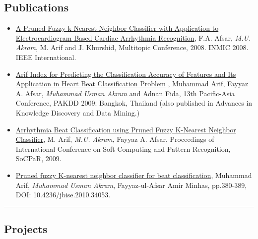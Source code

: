 \documentclass[10pt,letterpaper]{article}
\begin{document}
\subsection*{Publications}

\begin{itemize}
	\parskip=0.1em

	\item \href{http://ieeexplore.ieee.org/xpl/freeabs_all.jsp?reload=true&isnumber=4777689&arnumber=4777725&count=113&index=29}{A Pruned Fuzzy k-Nearest Neighbor Classifier with Application to Electrocardiogram Based Cardiac Arrhythmia Recognition}, F.A. Afsar,\emph{ M.U. Akram}, M. Arif and J. Khurshid, Multitopic Conference, 2008. INMIC 2008. IEEE International.
	\item \href{http://www.springerlink.com/content/w587r89h15691h20/?p=5a36883f07584ef8adbb2bbfb5761f6b&pi=0}{Arif Index for Predicting the Classification Accuracy of Features and Its Application in Heart Beat Classification Problem} , Muhammad Arif, Fayyaz A. Afsar, \emph{Muhammad Usman Akram} and Adnan Fida, 13th Pacific-Asia Conference, PAKDD 2009: Bangkok, Thailand (also published in Advances in Knowledge Discovery and Data Mining.)
	\item \href{http://ieeexplore.ieee.org/xpl/freeabs_all.jsp?isnumber=5368599&arnumber=5368654&count=148&index=15}{Arrhythmia Beat Classification using Pruned Fuzzy K-Nearest Neighbor Classifier}, M. Arif, \emph{M.U. Akram}, Fayyaz A. Afsar, Proceedings of International Conference on Soft Computing and Pattern Recognition, SoCPaR, 2009.
	\item \href{http://www.scirp.org/Journal/PaperDownload.aspx?paperID=1606&fileName=JBiSE20100400008_94593058.pdf}{Pruned fuzzy K-nearest neighbor classifier for beat classification}, Muhammad Arif, \emph{Muhammad Usman Akram}, Fayyaz-ul-Afsar Amir Minhas, pp.380-389, DOI: 10.4236/jbise.2010.34053.
\end{itemize}


\hrule
\vspace{-0.4em}
\subsection*{Projects}
\end{document}
